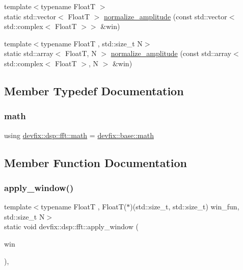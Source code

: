 \begin{DoxyCompactItemize}
\item 
{\footnotesize template$<$typename FloatT $>$ }\\static std\+::vector$<$ FloatT $>$ \hyperlink{structdevfix_1_1dsp_1_1fft_a3239f4400b0e1c98d5f912b129f199e8}{normalize\+\_\+amplitude} (const std\+::vector$<$ std\+::complex$<$ FloatT $>$$>$ \&win)
\item 
{\footnotesize template$<$typename FloatT , std\+::size\+\_\+t N$>$ }\\static std\+::array$<$ FloatT, N $>$ \hyperlink{structdevfix_1_1dsp_1_1fft_a1256d8b92604d120406a32fb13be7501}{normalize\+\_\+amplitude} (const std\+::array$<$ std\+::complex$<$ FloatT $>$, N $>$ \&win)
\end{DoxyCompactItemize}


\subsection{Member Typedef Documentation}
\mbox{\label{structdevfix_1_1dsp_1_1fft_a466499f45d4ae1240f5ba7e8c44a4691}} 
\subsubsection{\texorpdfstring{math}{math}}
{\footnotesize\ttfamily using \hyperlink{structdevfix_1_1dsp_1_1fft_a466499f45d4ae1240f5ba7e8c44a4691}{devfix\+::dsp\+::fft\+::math} =  \hyperlink{structdevfix_1_1base_1_1math}{devfix\+::base\+::math}}



\subsection{Member Function Documentation}
\mbox{\label{structdevfix_1_1dsp_1_1fft_a6ffabd9d450ce2702b0ec825c6758e81}} 
\subsubsection{\texorpdfstring{apply\+\_\+window()}{apply\_window()}\hspace{0.1cm}{\footnotesize\ttfamily [1/3]}}
{\footnotesize\ttfamily template$<$typename FloatT , Float\+T($\ast$)(std\+::size\+\_\+t, std\+::size\+\_\+t) win\+\_\+fun, std\+::size\+\_\+t N$>$ \\
static void devfix\+::dsp\+::fft\+::apply\+\_\+window (\begin{DoxyParamCaption}\item[{std\+::complex$<$ FloatT $>$ $\ast$}]{win }\end{DoxyParamCaption})\hspace{0.3cm}{\ttfamily [inline]}, {\ttfamily [static]}}

